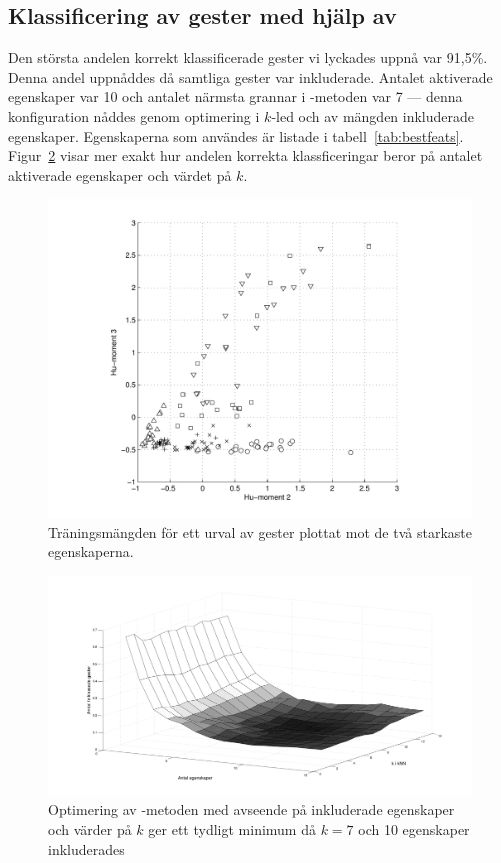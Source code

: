 \documentclass[../rapport_MVEX01-11-05]{subfiles}
\begin{document}
\subsection{Klassificering av gester med hjälp av \knn}
Den största andelen korrekt klassificerade gester vi lyckades uppnå var 91,5\%.
Denna andel uppnåddes då samtliga gester var inkluderade. Antalet aktiverade
egenskaper var 10 och antalet närmsta grannar i \knn-metoden var 7 --- denna
konfiguration nåddes genom optimering i $k$-led och av mängden inkluderade
egenskaper. Egenskaperna som
användes är listade i tabell~\ref{tab:bestfeats}.
Figur~\ref{fig:knn-optimering} visar mer exakt hur andelen korrekta
klassficeringar beror på antalet aktiverade egenskaper och värdet på $k$.

\begin{figure}[tbp]
  \centering
  \includegraphics[width=\textwidth,trim=2cm 0.5cm 2cm 0,clip=true]{bilder/feats-10+11}
  \caption{Träningsmängden för ett urval av gester plottat mot de två starkaste
  egenskaperna. }
  \label{fig:feats1011}
\end{figure}

\begin{figure}[tbp]
    \begin{center}
        \includegraphics[trim=2cm 2cm 2cm 1.8cm,width=\columnwidth,clip=true]{bilder/knn_optimering}
    \end{center}
    \caption{Optimering av \knn-metoden med avseende på inkluderade egenskaper
och värder på $k$ ger ett tydligt minimum då $k=7$ och 10 egenskaper inkluderades}
    \label{fig:knn-optimering}
\end{figure}
\end{document}
